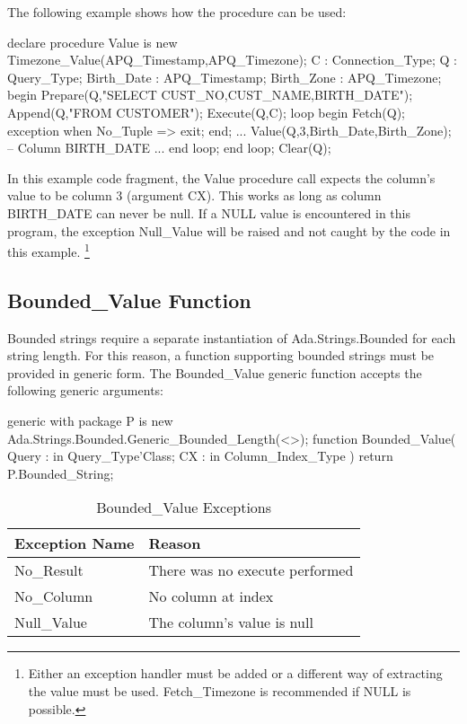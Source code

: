 \documentclass[english,letterpaper]{book}
\begin{document}
The following example shows how the procedure can be used:

\begin{Example}
declare
   procedure Value is new Timezone_Value(APQ_Timestamp,APQ_Timezone);
   C : Connection_Type;
   Q : Query_Type;
   Birth_Date : APQ_Timestamp;
   Birth_Zone : APQ_Timezone;
begin
   Prepare(Q,"SELECT CUST_NO,CUST_NAME,BIRTH_DATE");
   Append(Q,"FROM CUSTOMER");
   Execute(Q,C);
   loop
      begin
         Fetch(Q);
      exception
         when No_Tuple =>
            exit;
      end;
      ...
      Value(Q,3,Birth_Date,Birth_Zone); -- Column BIRTH_DATE
      ...
      end loop;
   end loop;
   Clear(Q);
\end{Example}

In this example code fragment, the Value procedure call expects the
column's value to be column 3 (argument CX). This works as long as
column BIRTH\_DATE can never be null. If a NULL value is encountered
in this program, the exception Null\_Value will be raised and not
caught by the code in this example.%
\footnote{Either an exception handler must be added or a different way of extracting
the value must be used. Fetch\_Timezone is recommended if NULL is
possible.}

\subsection{Bounded\_Value Function}

Bounded strings require a separate instantiation of
Ada\-.Strings\-.Bounded for each string length.
For this reason, a function supporting bounded strings must be provided
in generic form. The Bounded\_Value generic function accepts
the following generic arguments:

\begin{Code}
generic
   with package P is new
      Ada.Strings.Bounded.Generic_Bounded_Length(<>);
function Bounded_Value(
   Query : in Query_Type'Class;
   CX :    in Column_Index_Type
) return P.Bounded_String;
\end{Code}

\begin{table}
   \begin{center}
      \begin{tabular}{ll}
         Exception Name    &  Reason\\
         \hline 
         No\_Result        &  There was no execute performed\\
         No\_Column        &  No column at index\\
         Null\_Value       &  The column's value is null\\
      \end{tabular}
   \end{center}
   \caption{Bounded\_Value Exceptions}\label{t:bvx}
\end{table}
\end{document}
